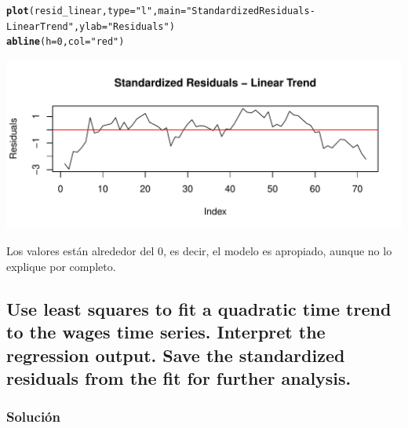 \documentclass[12pt]{article}\usepackage[]{graphicx}\usepackage[]{xcolor}
\makeatletter
\def\maxwidth{ %
  \ifdim\Gin@nat@width>\linewidth
    \linewidth
  \else
    \Gin@nat@width
  \fi
}
\newcommand{\hlnum}[1]{\textcolor[rgb]{0.686,0.059,0.569}{#1}}%
\newcommand{\hlsng}[1]{\textcolor[rgb]{0.192,0.494,0.8}{#1}}%
\newcommand{\hldef}[1]{\textcolor[rgb]{0.345,0.345,0.345}{#1}}%
\newcommand{\hlkwc}[1]{\textcolor[rgb]{0.333,0.667,0.333}{#1}}%
\newcommand{\hlkwd}[1]{\textcolor[rgb]{0.737,0.353,0.396}{\textbf{#1}}}%
\newenvironment{kframe}{%
 \def\at@end@of@kframe{}%
 \ifinner\ifhmode%
  \def\at@end@of@kframe{\end{minipage}}%
  \begin{minipage}{\columnwidth}%
 \fi\fi%
 \def\FrameCommand##1{\hskip\@totalleftmargin \hskip-\fboxsep
 \colorbox{shadecolor}{##1}\hskip-\fboxsep
     \hskip-\linewidth \hskip-\@totalleftmargin \hskip\columnwidth}%
 \MakeFramed {\advance\hsize-\width
   \@totalleftmargin\z@ \linewidth\hsize
   \@setminipage}}%
 {\par\unskip\endMakeFramed%
 \at@end@of@kframe}
\newenvironment{knitrout}{}{} %
\makeatother
\begin{document}
\begin{knitrout}
\color{fgcolor}\begin{kframe}
\begin{alltt}
\hlkwd{plot}\hldef{(resid_linear,} \hlkwc{type} \hldef{=} \hlsng{"l"}\hldef{,} \hlkwc{main} \hldef{=} \hlsng{"Standardized Residuals - Linear Trend"}\hldef{,} \hlkwc{ylab} \hldef{=} \hlsng{"Residuals"}\hldef{)}
\hlkwd{abline}\hldef{(}\hlkwc{h} \hldef{=} \hlnum{0}\hldef{,} \hlkwc{col} \hldef{=} \hlsng{"red"}\hldef{)}
\end{alltt}
\end{kframe}
\includegraphics[width=\maxwidth]{figure/unnamed-chunk-14-1} 
\end{knitrout}

Los valores están alrededor del 0, es decir, el modelo es apropiado, aunque no lo explique por completo.


\subsection{ Use least squares to fit a quadratic time trend to the wages time series. Interpret the regression output. Save the standardized residuals from the fit for further analysis.}


\subsubsection{Solución}
\end{document}
